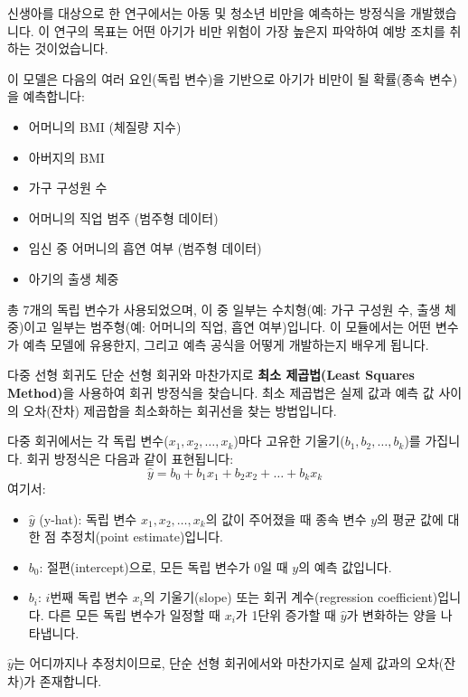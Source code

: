 \documentclass[11pt,a4paper]{article}
\theoremstyle{definition}
\begin{document}
\begin{examplebox}[title=\textbf{예시: 아동 비만 예측 모델}]
신생아를 대상으로 한 연구에서는 아동 및 청소년 비만을 예측하는 방정식을 개발했습니다. 이 연구의 목표는 어떤 아기가 비만 위험이 가장 높은지 파악하여 예방 조치를 취하는 것이었습니다.

이 모델은 다음의 여러 요인(독립 변수)을 기반으로 아기가 비만이 될 확률(종속 변수)을 예측합니다:
\begin{itemize}
    \item 어머니의 BMI (체질량 지수)
    \item 아버지의 BMI
    \item 가구 구성원 수
    \item 어머니의 직업 범주 (범주형 데이터)
    \item 임신 중 어머니의 흡연 여부 (범주형 데이터)
    \item 아기의 출생 체중
\end{itemize}
총 7개의 독립 변수가 사용되었으며, 이 중 일부는 수치형(예: 가구 구성원 수, 출생 체중)이고 일부는 범주형(예: 어머니의 직업, 흡연 여부)입니다. 이 모듈에서는 어떤 변수가 예측 모델에 유용한지, 그리고 예측 공식을 어떻게 개발하는지 배우게 됩니다.
\end{examplebox}

\begin{tcolorbox}[title=\textbf{최소 제곱 추정 (Least Square Estimation)}]
다중 선형 회귀도 단순 선형 회귀와 마찬가지로 \textbf{최소 제곱법(Least Squares Method)}을 사용하여 회귀 방정식을 찾습니다. 최소 제곱법은 실제 값과 예측 값 사이의 오차(잔차) 제곱합을 최소화하는 회귀선을 찾는 방법입니다.

다중 회귀에서는 각 독립 변수($x_1, x_2, \dots, x_k$)마다 고유한 기울기($b_1, b_2, \dots, b_k$)를 가집니다. 회귀 방정식은 다음과 같이 표현됩니다:
\[ \hat{y} = b_0 + b_1x_1 + b_2x_2 + \dots + b_kx_k \]
여기서:
\begin{itemize}
    \item $\hat{y}$ (y-hat): 독립 변수 $x_1, x_2, \dots, x_k$의 값이 주어졌을 때 종속 변수 $y$의 평균 값에 대한 점 추정치(point estimate)입니다.
    \item $b_0$: 절편(intercept)으로, 모든 독립 변수가 0일 때 $y$의 예측 값입니다.
    \item $b_i$: $i$번째 독립 변수 $x_i$의 기울기(slope) 또는 회귀 계수(regression coefficient)입니다. 다른 모든 독립 변수가 일정할 때 $x_i$가 1단위 증가할 때 $\hat{y}$가 변화하는 양을 나타냅니다.
\end{itemize}
$\hat{y}$는 어디까지나 추정치이므로, 단순 선형 회귀에서와 마찬가지로 실제 값과의 오차(잔차)가 존재합니다.
\end{tcolorbox}
\end{document}
